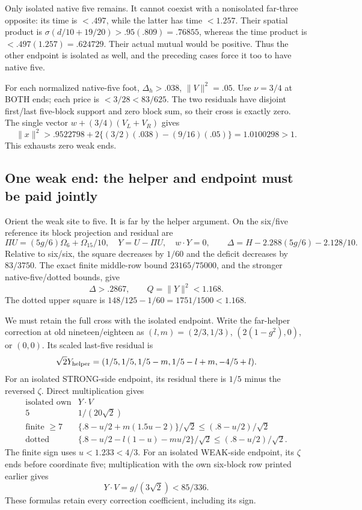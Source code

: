 Only isolated native five remains.
It cannot coexist with a nonisolated
far-three opposite: its time is
\(<.497\), while the latter has
time \(<1.257\).
Their spatial product is
\(\sigma(d/10+19/20)>.95(.809)=.76855\),
whereas the time product is
\(<.497(1.257)=.624729\).
Their actual mutual would be
positive.
Thus the other endpoint is isolated
as well, and the preceding cases
force it too to have native five.

For each normalized native-five foot,
\(\Delta_h>.038\), \(\|V\|^2=.05\).
Use \(\nu=3/4\) at BOTH ends;
each price is \(<3/28<83/625\).
The two residuals have disjoint
first/last five-block support and
zero block sum, so their cross
is exactly zero.
The single vector
\(w+(3/4)(V_L+V_R)\) gives
\[
 \|x\|^2>.9522798+
       2\{(3/2)(.038)-(9/16)(.05)\}
                       =1.0100298>1 .
\]
This exhausts zero weak ends.

\subsection{One weak end: the helper and endpoint must be paid jointly}
\label{app:exact19:Aoneweak}

Orient the weak site to five.
It is far by the helper argument.
On the six/five reference its
block projection and residual are
\[
 \Pi U=(5g/6)\Omega_6+\Omega_{15}/10,\quad
 Y=U-\Pi U,\quad w\cdot Y=0,
 \qquad\Delta=H-2.288(5g/6)-2.128/10 .
\]
Relative to six/six,
the square decreases by \(1/60\)
and the deficit decreases by
\(83/3750\).
The exact finite middle-row bound
\(23165/75000\), and the stronger
native-five/dotted bounds, give
\[
                       \Delta>.2867,\qquad Q=\|Y\|^2<1.168 .
\]
The dotted upper square is
\(148/125-1/60=1751/1500<1.168\).

We must retain the full cross with
the isolated endpoint.
Write the far-helper correction
at old nineteen/eighteen as
\((l,m)=(2/3,1/3)\),
\((2(1-g^2),0)\), or \((0,0)\).
Its scaled last-five residual is
\[
             \sqrt2Y_{\rm helper}
               =(1/5,1/5,1/5-m,1/5-l+m,-4/5+l).
\]
For an isolated STRONG-side endpoint,
its residual there is \(1/5\)
minus the reversed \(\zeta\).
Direct multiplication gives
\[
\begin{array}{c|c}
 \text{isolated own}&Y\cdot V\\ \hline
 5&1/(20\sqrt2)\\
 \text{finite }\ge7&
       \{.8-u/2+m(1.5u-2)\}/\sqrt2\le(.8-u/2)/\sqrt2\\
 \text{dotted}&
       \{.8-u/2-l(1-u)-mu/2\}/\sqrt2\le(.8-u/2)/\sqrt2 .
\end{array}
\]
The finite sign uses \(u<1.233<4/3\).
For an isolated WEAK-side endpoint,
its \(\zeta\) ends before coordinate
five; multiplication with the own
six-block row printed earlier gives
\[
                             Y\cdot V=g/(3\sqrt2)<85/336 .
\]
These formulas retain every correction
coefficient, including its sign.

